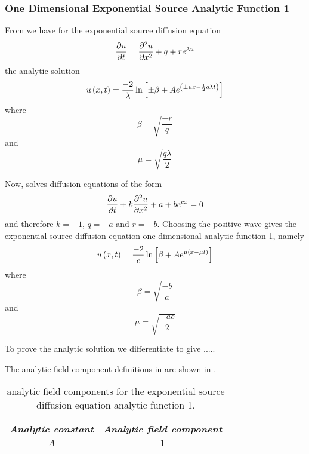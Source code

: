 \subsubsection{One Dimensional Exponential Source Analytic Function 1}

From  we have for
the \oned exponential source diffusion equation
\begin{equation}
   \dfrac{\partial u}{\partial t} = \dfrac{\partial^{2} u}{\partial {x}^{2}} +q+re^{\lambda u}
\end{equation}
the analytic solution
\begin{equation}
   u\left( x,t \right) =\dfrac{-2}{\lambda}\ln\left[ \pm\beta+Ae^{\left( \pm\mu x - \frac{1}{2}q \lambda t \right)} \right]
\end{equation}
where
\begin{equation}
  \beta=\sqrt{\dfrac{-r}{q}}
\end{equation}
and 
\begin{equation}
  \mu=\sqrt{\dfrac{q\lambda}{2}}
\end{equation}

Now, \OpenCMISS solves diffusion equations of the form
\begin{equation}
  \delby{u}{t}+k\deltwosqby{u}{x}+a+be^{cx}=0
  \label{eqn:OpenCMISSExponentialSourceDiffusionEquationOneDim}
\end{equation}
and therefore $k=-1$, $q=-a$ and $r=-b$. Choosing the positive wave gives the
\OpenCMISS exponential source diffusion equation one dimensional analytic function 1, namely
\begin{equation}
  \fnof{u}{x,t}=\dfrac{-2}{c}\ln\sqbrac{\beta+Ae^{\mu\pbrac{x - \mu t}}}
  \label{eqn:AnalyticExponentialSourceDiffusionEquationOneDim1}
\end{equation}
where
\begin{equation}
  \beta=\sqrt{\dfrac{-b}{a}}
\end{equation}
and 
\begin{equation}
  \mu=\sqrt{\dfrac{-ac}{2}}
\end{equation}

To prove the analytic solution we differentiate
 to give .....

The analytic field component definitions in \OpenCMISS are shown in .

\begin{table}[htb] \centering
  \begin{tabular}{|c|c|} \hline
    \emph{Analytic constant} & \emph{Analytic field component} \\ \hline \hline
    $A$ & $1$ \\ \hline
  \end{tabular}
  \caption{\OpenCMISS analytic field components for the \oned exponential
    source diffusion equation analytic function 1.}
  \label{tab:OpenCMISSAnalyticFieldExponentialSoureDiffusionEquationOneDim1}
\end{table}


